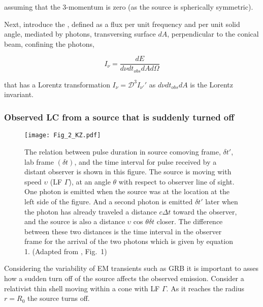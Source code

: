 assuming that the $3$-momentum is zero (as the source is spherically symmetric).

Next, introduce the , defined as a flux per unit frequency and per unit solid angle, mediated by photons, transversing surface $dA$, perpendicular to the conical beam, confining the photons, 

\begin{equation}
I_{\nu} = \frac{dE}{d\nu dt_{obs} dA d\Omega}
\end{equation}

that has a Lorentz transformation $I_{\nu} = \mathcal{D}^3 I_{\nu'}'$ as $d\nu dt_{obs} dA$ is the Lorentz invariant.


\subsubsection{Observed \ac{LC} from a source that is suddenly turned off}

\begin{figure*}[t]
    \centering 
    \texttt{[image: Fig\_2\_KZ.pdf]}
    \caption{
        The relation between pulse duration in source comoving frame, $\delta t'$, lab frame
        $(\delta t)$, and the time interval for pulse received by a distant observer is shown in this figure. The source is moving with speed $\upsilon$ (\ac{LF} $\Gamma$), at an angle $\theta$ with
        respect to observer line of sight. One photon is emitted when the source was at the
        location at the left side of the figure. And a second photon is emitted $\delta t'$ later when
        the photon has already traveled a distance $c\Delta t$ toward the observer, and the source
        is also a distance $\upsilon$ cos $\theta\delta t$ closer. The difference between these two distances is the
        time interval in the observer frame for the arrival of the two photons which is given
        by equation 1.
        (Adapted from \citet{Kumar:2014upa}, Fig.~1)
    }
    \label{fig:aafg:theory:sr2}
\end{figure*}


Considering the variability of \ac{EM} transients such as \ac{GRB} it is important to asses how a sudden turn off of the source affects the observed emission. 
Consider a relativist thin shell moving within a cone with \ac{LF} $\Gamma$. As it reaches the radius $r=R_0$ the source turns off. 

